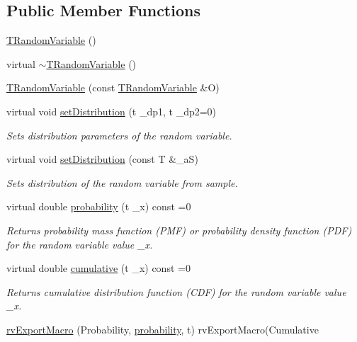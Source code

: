 \subsection*{Public Member Functions}
\begin{DoxyCompactItemize}
\item 
\hyperlink{class_t_random_variable_a74687a0af21045e76e3f5c6aa7ac9667}{T\-Random\-Variable} ()
\item 
virtual \hyperlink{class_t_random_variable_a4d3cf386991ad9bcf16e534af1160e97}{$\sim$\-T\-Random\-Variable} ()
\item 
\hyperlink{class_t_random_variable_aab9e5162a100662d832403f6d2347272}{T\-Random\-Variable} (const \hyperlink{class_t_random_variable}{T\-Random\-Variable} \&O)
\item 
virtual void \hyperlink{class_t_random_variable_a4b92146e4616cd65c98fed3070644404}{set\-Distribution} (t \-\_\-dp1, t \-\_\-dp2=0)
\begin{DoxyCompactList}\small\item\em Sets distribution parameters of the random variable. \end{DoxyCompactList}\item 
virtual void \hyperlink{class_t_random_variable_a8b793c2e215575a270004146bb8bc491}{set\-Distribution} (const T \&\-\_\-a\-S)
\begin{DoxyCompactList}\small\item\em Sets distribution of the random variable from sample. \end{DoxyCompactList}\item 
virtual double \hyperlink{class_t_random_variable_aec8f8c21abba012d70f00c48679ff6c8}{probability} (t \-\_\-x) const =0
\begin{DoxyCompactList}\small\item\em Returns probability mass function (P\-M\-F) or probability density function (P\-D\-F) for the random variable value \-\_\-x. \end{DoxyCompactList}\item 
virtual double \hyperlink{class_t_random_variable_a465dbc0834d2ad7dc731632729873640}{cumulative} (t \-\_\-x) const =0
\begin{DoxyCompactList}\small\item\em Returns cumulative distribution function (C\-D\-F) for the random variable value \-\_\-x. \end{DoxyCompactList}\item 
\hyperlink{class_t_random_variable_af64e0bddf1c48739b0f69c5a30931ac4}{rv\-Export\-Macro} (Probability, \hyperlink{class_t_random_variable_aec8f8c21abba012d70f00c48679ff6c8}{probability}, t) rv\-Export\-Macro(Cumulative

\end{DoxyCompactItemize}
